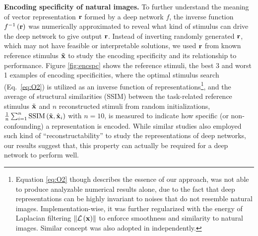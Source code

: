 \documentclass[10pt,twocolumn,letterpaper]{article}
\begin{document}

\newcommand{\expregular}{Equation \ref{eq:O2} though describes the essence of our approach, was not able to produce analyzable numerical results alone, due to the fact that deep representations can be highly invariant to noises that do not resemble natural images.
Implementation-wise, it was further regularized with the energy of Laplacian filtering $\left\| \mathcal{L} \left( \bf{x} \right) \right\|$ to enforce smoothness and similarity to natural images.
Similar concept was also adopted in \cite{mahendran2014understanding} independently.
}  %

{\bf Encoding specificity of natural images.} To further understand the meaning of vector representation $\bf{r}$ formed by a deep network $f$, the inverse function $f^{-1}\left( \bf{r} \right)$ {was} numerically approximated to reveal what kind of stimulus can drive the deep network to give output $\bf{r}$. 
Instead of inverting randomly generated $\bf{r}$, which may not have feasible or interpretable solutions, we {used} $\bf{r}$ from known reference stimulus $\tilde{\bf{x}}$ to study the encoding specificity and its relationship to performance.
Figure \ref{fig:encspc} shows the reference stimuli, the best 3 and worst 1 examples of encoding specificities, where the optimal stimulus search (Eq.~\ref{eq:O2}) is utilized as an inverse function of representations\footnote{\expregular}, and the average of structural similarities (SSIM) \cite{wang2004image} between the task-related reference stimulus $\tilde{\bf{x}}$ and $n$ reconstructed stimuli from random initializations, \ie $\frac{1}{n}\sum_{i=1}^{n} \mathrm{SSIM}\left(\tilde{\bf{x}} , \hat{{\bf{x}}}_i \right)$ with $n=10$, is measured to indicate how specific (or non-confounding) a representation is encoded.
While similar studies \cite{mahendran2014understanding, long2014convnets, razavian2014persistent} also employed such kind of ``reconstructability'' to study the representations of deep networks, our results suggest that, this property can actually be required for a deep network to perform well.

\end{document}
